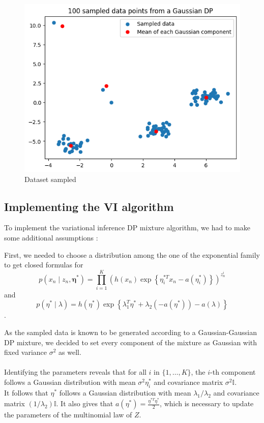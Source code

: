 \documentclass{article}
\begin{document}
\begin{figure}[H]
    \centering
    \includegraphics[scale=0.5]{images/sampled_dataset.png}
    \caption{Dataset sampled}
    \label{fig:data_sampl}
\end{figure}

\subsection{Implementing the VI algorithm}
To implement the variational inference DP mixture algorithm, we had to make some additional assumptions :

First, we needed to choose a distribution among the one of the exponential family to get closed formulas for
$$p\left(x_n \mid z_n, \boldsymbol{\eta}^*\right)=\prod_{i=1}^K\left(h\left(x_n\right) \exp \left\{\eta_i^{* T} x_n-a\left(\eta_i^*\right)\right\}\right)^{z_n^i}$$ and $$p\left(\eta^* \mid \lambda\right)=h\left(\eta^*\right) \exp \left\{\lambda_1^T \eta^*+\lambda_2\left(-a\left(\eta^*\right)\right)-a(\lambda)\right\}$$.

As the sampled data is known to be generated according to a Gaussian-Gaussian DP mixture, we decided to set every component of the mixture as Gaussian with fixed variance $\sigma^2$ as well.
\\\\
Identifying the parameters reveals that for all \(i\) in \(\{1, \ldots, K\}\), the \(i\)-th component follows a Gaussian distribution with mean \(\sigma^2\eta^*_i\) and covariance matrix \(\sigma^2\mathbb{I}\). \\
It follows that \(\eta^*\) follows a Gaussian distribution with mean \(\lambda_1 / \lambda_2\) and covariance matrix \((1/\lambda_2)\mathbb{I}\).
It also gives that \(a(\eta^*) = \frac{\eta^{*T}\eta^*}{2}\), which is necessary to update the parameters of the multinomial law of \(Z\).\\
\end{document}
